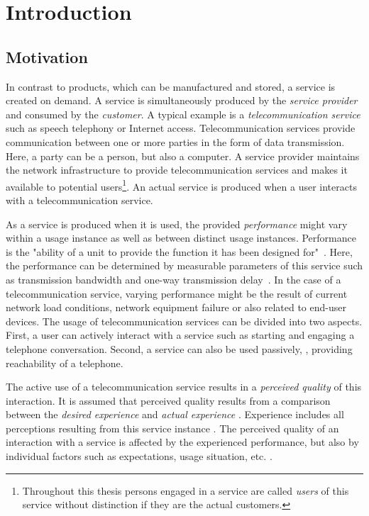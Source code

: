 \chapter{Introduction}\label{chap:01}

\section{Motivation}
In contrast to products, which can be manufactured and stored, a service is created on demand.
A service is simultaneously produced by the \emph{service provider} and consumed by the \emph{customer}.
A typical example is a \emph{telecommunication service} such as speech telephony or Internet access.
Telecommunication services provide communication between one or more parties in the form of data transmission.
Here, a party can be a person, but also a computer.
A service provider maintains the network infrastructure to provide telecommunication services and makes it available to potential users\footnote{Throughout this thesis persons engaged in a service are called \emph{users} of this service without distinction if they are the actual customers.}.
An actual service is produced when a user interacts with a telecommunication service.

As a service is produced when it is used, the provided \emph{performance} might vary within a usage instance as well as between distinct usage instances.
Performance is the "ability of a unit to provide the function it has been designed for"~\citep[][p.~360]{moller_quality_2005}.
Here, the performance can be determined by measurable parameters of this service such as transmission bandwidth and one-way transmission delay~\citep[][p.~12]{moller_assessment_2000}.
In the case of a telecommunication service, varying performance might be the result of current network load conditions, network equipment failure or also related to end-user devices.
The usage of telecommunication services can be divided into two aspects.
First, a user can actively interact with a service such as starting and engaging a telephone conversation.
Second, a service can also be used passively, \eg, providing reachability of a telephone.

The active use of a telecommunication service results in a \emph{perceived quality} of this interaction.
It is assumed that perceived quality results from a comparison between the \emph{desired experience} and \emph{actual experience} \citep[][p.~13]{raake_quality_2014}. %
Experience includes all perceptions resulting from this service instance \citep[][p.~13]{raake_quality_2014}.
The perceived quality of an interaction with a service is affected by the experienced performance, but also by individual factors such as expectations, usage situation, etc. \citep[\eg,][p.~55ff.]{reiter_factors_2014}.

